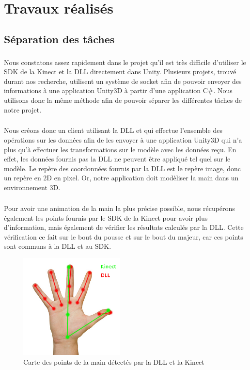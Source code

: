 \chapter{Travaux réalisés}


\section{Séparation des tâches}
\paragraph{}
Nous constatons assez rapidement dans le projet qu'il est très difficile d'utiliser
le SDK de la Kinect et la DLL directement dans Unity. Plusieurs projets, trouvé durant nos recherche, utilisent un système 
de socket afin de pouvoir envoyer des informations à une application Unity3D à partir d'une application C\#.
Nous utilisons donc la même méthode afin de pouvoir séparer les différentes tâches de notre projet.

\paragraph{}
Nous créons donc un client utilisant la DLL et qui effectue l'ensemble des opérations sur les données afin
de les envoyer à une application Unity3D qui n'a plus qu'à effectuer les transformations sur le modèle avec
les données reçu. En effet, les données fournis pas la DLL ne peuvent être appliqué tel quel sur le modèle.
Le repère des coordonnées fournis par la DLL est le repère image, donc un repère en 2D en pixel. Or, notre 
application doit modèliser la main dans un environnement 3D.

\paragraph{}
Pour avoir une animation de la main la plus précise possible, nous récupérons également les points fournis par
le SDK de la Kinect pour avoir plus d'information, mais également de vérifier les résultats calculés par 
la DLL. Cette vérification ce fait sur le bout du pousse et sur le bout du majeur, car ces points sont communs
à la DLL et au SDK.

\begin{figure}[H]
  \label{carte_main}
  \begin{center}
    \includegraphics[width=200px]{images/main2.png}
    \caption{Carte des points de la main détectés par la DLL et la Kinect}
  \end{center}
\end{figure}

